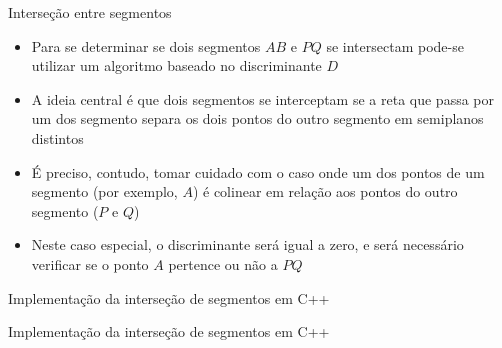 \begin{frame}[fragile]{Interseção entre segmentos}

    \begin{itemize}
        \item Para se determinar se dois segmentos $AB$ e $PQ$ se intersectam pode-se utilizar um
            algoritmo baseado no discriminante $D$
        \pause

        \item A ideia central é que dois segmentos se interceptam se a reta que passa por um
            dos segmento separa os dois pontos do outro segmento em semiplanos distintos
        \pause

        \item É preciso, contudo, tomar cuidado com o caso onde um dos pontos de um segmento
            (por exemplo, $A$) é colinear em relação aos pontos do outro segmento ($P$ e $Q$)
        \pause

        \item Neste caso especial, o discriminante será igual a zero, e será necessário verificar
            se o ponto $A$ pertence ou não a $PQ$
    \end{itemize}

\end{frame}

\begin{frame}[fragile]{Implementação da interseção de segmentos em C++}
\end{frame}

\begin{frame}[fragile]{Implementação da interseção de segmentos em C++}
\end{frame}
